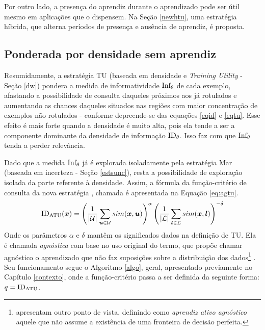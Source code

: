Por outro lado, a presença do aprendiz durante o aprendizado pode ser útil mesmo em aplicações que o dispensem.
Na Seção \ref{newhtu}, uma estratégia híbrida, que alterna períodos de presença e ausência de aprendiz, é proposta.

\subsection{Ponderada por densidade sem aprendiz}\label{newag}
Resumidamente, a estratégia TU (baseada em densidade e \textit{Training Utility} - Seção \ref{dw}) pondera a medida de informatividade $\operatorname*{Inf_\theta}$ de cada exemplo, afastando a possibilidade de consulta daqueles próximos aos já rotulados e aumentando as chances daqueles situados nas regiões com maior concentração de exemplos não rotulados - conforme depreende-se das equações \ref{eqid} e \ref{eqtu}.
Esse efeito é mais forte quando a densidade é muito alta, pois ela tende a ser a componente dominante da densidade de informação $\operatorname*{ID_\theta}$.
Isso faz com que $\operatorname*{Inf_\theta}$ tenda a perder relevância.

Dado que a medida $\operatorname*{Inf_\theta}$ já é explorada isoladamente pela estratégia Mar (baseada em incerteza - Seção \ref{estsunc}), resta a possibilidade de exploração isolada da parte referente à densidade. 
Assim, a fórmula da função-critério de consulta da nova estratégia \cite{bracis15}, chamada  é apresentada na Equação \ref{eq:agtu}.
\begin{equation}\label{eq:agtu}
 \operatorname*{ID_{ATU}}(\bm{x}) =
 \left(
 \frac{1}{|\mathcal{U}|}
 \sum_{\bm{u} \in \mathcal{U}} sim(\bm{x},\bm{u})
 \right)^\alpha
 \left(
 \frac{1}{|\mathcal{L}|}
 \sum_{\bm{l} \in \mathcal{L}} sim(\bm{x},\bm{l})\right)^{-\delta}
\end{equation}
Onde os parâmetros $\alpha$ e $\delta$ mantêm os significados dados na definição de TU.
Ela é chamada \textit{agnóstica} com base no uso original do termo, que propõe chamar agnóstico o aprendizado que não faz suposições sobre a distribuição dos dados\footnote{ apresentam outro ponto de vista, definindo como \textit{aprendiz ativo agnóstico} aquele que não assume a existência de uma fronteira de decisão perfeita.} \cite{journals/ml/KearnsSS94}.
Seu funcionamento segue o Algoritmo \ref{algo}, geral, apresentado previamente no Capítulo \ref{contexto}, onde a função-critério passa a ser definida da seguinte forma: $q=\operatorname*{ID_{ATU}}$.

